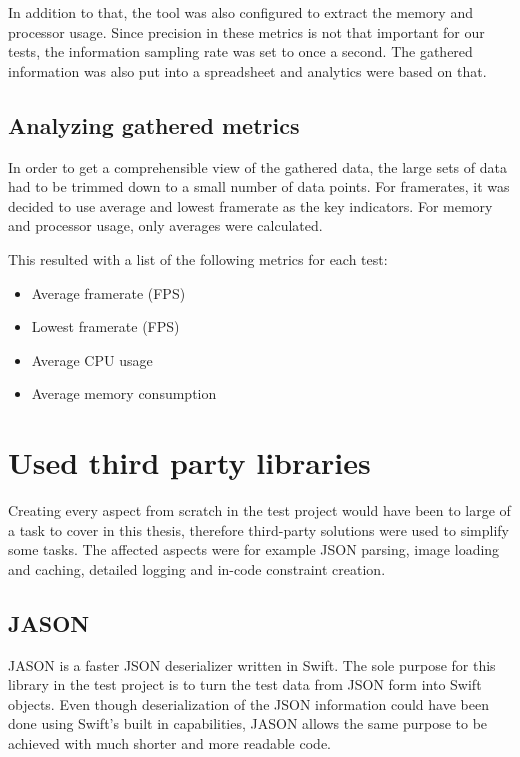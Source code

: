 \documentclass[a4paper,12pt]{article}
\begin{document}
In addition to that, the tool was also configured to extract the memory and processor usage. Since precision in these metrics is not that important for our tests, the information sampling rate was set to once a second. The gathered information was also put into a spreadsheet and analytics were based on that.

\subsection{Analyzing gathered metrics}
In order to get a comprehensible view of the gathered data, the large sets of data had to be trimmed down to a small number of data points. For framerates, it was decided to use average and lowest framerate as the key indicators. For memory and processor usage, only averages were calculated.

This resulted with a list of the following metrics for each test:
\begin{itemize}
  \item Average framerate (FPS)
  \item Lowest framerate (FPS)
  \item Average CPU usage
  \item Average memory consumption
\end{itemize}

\newpage
\section{Used third party libraries}
Creating every aspect from scratch in the test project would have been to large of a task to cover in this thesis, therefore third-party solutions were used to simplify some tasks. The affected aspects were for example JSON parsing, image loading and caching, detailed logging and in-code constraint creation.

\subsection{JASON}
JASON is a faster JSON deserializer written in Swift.\cite{JASON} The sole purpose for this library in the test project is to turn the test data from JSON form into Swift objects. Even though deserialization of the JSON information could have been done using Swift's built in capabilities, JASON allows the same purpose to be achieved with much shorter and more readable code.
\end{document}
